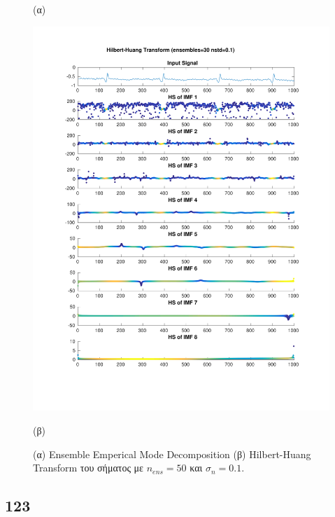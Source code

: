 \documentclass[11pt,a4paper]{article}
\begin{document}
\begin{figure}[H]
\begin{minipage}{0.48\textwidth}
	(α)
\end{minipage}
\begin{minipage}{0.48\textwidth}
	\centering
	\includegraphics[width=\textwidth]{fig/112l2_hht_ensemble.pdf}
	
	(β)
\end{minipage}
\vfill
\caption{(α) Ensemble Emperical Mode Decomposition (β) Hilbert-Huang Transform του σήματος με $n_{ens}=50$ και $\sigma_n = 0.1$.}
\label{fig:112l2_hht_ensemble}
\end{figure}


\subsection*{123}
\end{document}
